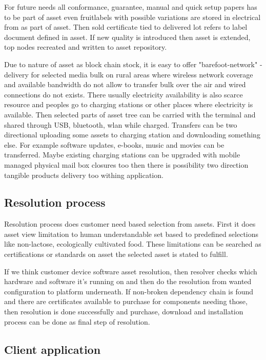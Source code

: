 For future needs all conformance, guarantee, manual and quick setup papers has to be part of asset even fruitlabels with possible variations are stored in electrical from as part of asset. Then sold certificate tied to delivered lot refers to label document defined in asset. If new quality is introduced then asset is extended, top nodes recreated and written to asset repository.

Due to nature of asset as block chain stock, it is easy to offer "barefoot-network" -delivery for selected media bulk on rural areas where wireless network coverage and available bandwidth do not allow to transfer bulk over the air and wired connections do not exists. There usually electricity availability is also scarce resource and peoples go to charging stations or other places where electricity is available. Then selected parts of asset tree can be carried with the terminal and shared through USB, bluetooth, wlan while charged. Transfers can be two directional uploading some assets to charging station and downloading something else. For example software updates, e-books, music and movies can be transferred. Maybe existing charging stations can be upgraded with mobile managed physical mail box closures too then there is possibility two direction tangible products delivery too withing application.

\subsection{Resolution process}
\label{resolution}

Resolution process does customer need based selection from assets. First it does asset view limitation to human understandable set based to predefined selections like non-lactose, ecologically cultivated food. These limitations can be searched as certifications or standards on asset the selected asset is stated to fulfill.  

If we think customer device software asset resolution, then resolver checks which hardware and software it's running on and then do the resolution from wanted configuration to platform underneath. If non-broken dependency chain is found and there are certificates available to purchase for components needing those, then resolution is done successfully and purchase, download and installation process can be done as final step of resolution.  

\subsection{Client application}
\label{client_application}

